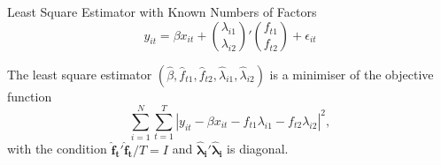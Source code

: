 \documentclass{beamer}
\begin{document}










\begin{frame}{Least Square Estimator with Known Numbers of Factors}
{\color{gray}\footnotesize \[
       y_{it}= \beta x_{it}+\binom{\lambda_{i1}}{\lambda_{i2}}' \binom{f_{t1}}{f_{t2}}+\epsilon_{it}
    \]}

    The least square estimator $(\hat\beta,\hat f_{t1},\hat f_{t2}, \hat \lambda_{i1}, \hat \lambda_{i2})$ is a minimiser of the objective function \[
        \sum_{i=1}^N\sum_{t=1}^T \left| y_{it}-\beta x_{it}-f_{t1}\lambda_{i1}-f_{t2}\lambda_{i2}\right|^2,
        \]
    with the condition $\boldsymbol{\hat f_t'}\boldsymbol{\hat f_t}/T=I$ and $\boldsymbol{\hat \lambda_i}'\boldsymbol{\hat \lambda_i}$ is diagonal.
\end{frame}
\end{document}
